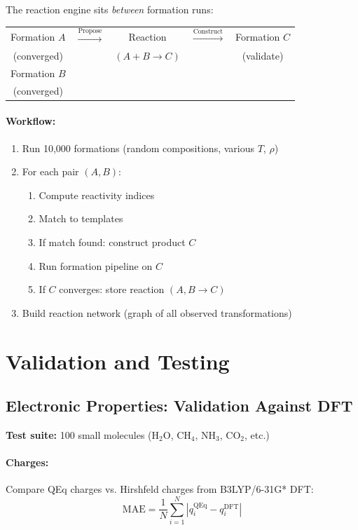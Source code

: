 \documentclass[11pt]{article}
\begin{document}
The reaction engine sits \textit{between} formation runs:

\begin{center}
\begin{tabular}{ccccc}
Formation $A$ & $\xrightarrow{\text{Propose}}$ & Reaction & $\xrightarrow{\text{Construct}}$ & Formation $C$ \\
(converged) & & $(A + B \to C)$ & & (validate) \\
Formation $B$ & & & & \\
(converged) & & & &
\end{tabular}
\end{center}

\paragraph{Workflow:}
\begin{enumerate}
\item Run 10,000 formations (random compositions, various $T$, $\rho$)
\item For each pair $(A, B)$:
\begin{enumerate}
\item Compute reactivity indices
\item Match to templates
\item If match found: construct product $C$
\item Run formation pipeline on $C$
\item If $C$ converges: store reaction $(A, B \to C)$
\end{enumerate}
\item Build reaction network (graph of all observed transformations)
\end{enumerate}

\section{Validation and Testing}

\subsection{Electronic Properties: Validation Against DFT}

\textbf{Test suite:} 100 small molecules (H$_2$O, CH$_4$, NH$_3$, CO$_2$, etc.)

\paragraph{Charges:}
Compare QEq charges vs. Hirshfeld charges from B3LYP/6-31G* DFT:
\begin{equation}
\text{MAE} = \frac{1}{N}\sum_{i=1}^{N} |q_i^{\text{QEq}} - q_i^{\text{DFT}}|
\end{equation}
\end{document}

